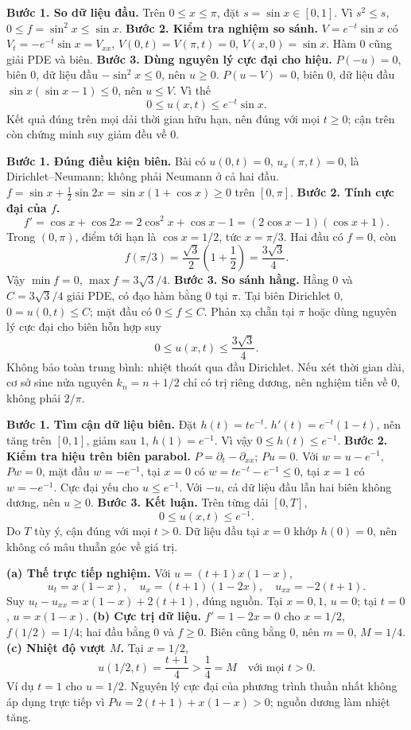 \textbf{Bước 1. So dữ liệu đầu.} Trên $0\le x\le\pi$, đặt $s=\sin x\in[0,1]$. Vì $s^2\le s$, $0\le f=\sin^2x\le\sin x$.
\textbf{Bước 2. Kiểm tra nghiệm so sánh.} $V=e^{-t}\sin x$ có $V_t=-e^{-t}\sin x=V_{xx}$, $V(0,t)=V(\pi,t)=0$, $V(x,0)=\sin x$. Hàm $0$ cũng giải PDE và biên.
\textbf{Bước 3. Dùng nguyên lý cực đại cho hiệu.} $P(-u)=0$, biên $0$, dữ liệu đầu $-\sin^2x\le0$, nên $u\ge0$. $P(u-V)=0$, biên $0$, dữ liệu đầu $\sin x(\sin x-1)\le0$, nên $u\le V$. Vì thế
\[0\le u(x,t)\le e^{-t}\sin x.\]
Kết quả đúng trên mọi dải thời gian hữu hạn, nên đúng với mọi $t\ge0$; cận trên còn chứng minh suy giảm đều về $0$.

\textbf{Bước 1. Đúng điều kiện biên.} Bài có $u(0,t)=0$, $u_x(\pi,t)=0$, là Dirichlet–Neumann; không phải Neumann ở cả hai đầu. $f=\sin x+\frac12\sin2x=\sin x(1+\cos x)\ge0$ trên $[0,\pi]$.
\textbf{Bước 2. Tính cực đại của $f$.}
\[f'=\cos x+\cos2x=2\cos^2x+\cos x-1
=(2\cos x-1)(\cos x+1).\]
Trong $(0,\pi)$, điểm tới hạn là $\cos x=1/2$, tức $x=\pi/3$. Hai đầu có $f=0$, còn
\[f(\pi/3)=\frac{\sqrt3}2\left(1+\frac12\right)=\frac{3\sqrt3}4.\]
Vậy $\min f=0$, $\max f=3\sqrt3/4$.
\textbf{Bước 3. So sánh hằng.} Hằng $0$ và $C=3\sqrt3/4$ giải PDE, có đạo hàm bằng $0$ tại $\pi$. Tại biên Dirichlet $0$, $0=u(0,t)\le C$; mặt đầu có $0\le f\le C$. Phản xạ chẵn tại $\pi$ hoặc dùng nguyên lý cực đại cho biên hỗn hợp suy
\[0\le u(x,t)\le\frac{3\sqrt3}4.\]
Không bảo toàn trung bình: nhiệt thoát qua đầu Dirichlet. Nếu xét thời gian dài, cơ sở sine nửa nguyên $k_n=n+1/2$ chỉ có trị riêng dương, nên nghiệm tiến về $0$, không phải $2/\pi$.

\textbf{Bước 1. Tìm cận dữ liệu biên.} Đặt $h(t)=te^{-t}$. $h'(t)=e^{-t}(1-t)$, nên tăng trên $[0,1]$, giảm sau $1$, $h(1)=e^{-1}$. Vì vậy $0\le h(t)\le e^{-1}$.
\textbf{Bước 2. Kiểm tra hiệu trên biên parabol.} $P=\partial_t-\partial_{xx}$; $Pu=0$. Với $w=u-e^{-1}$, $Pw=0$, mặt đầu $w=-e^{-1}$, tại $x=0$ có $w=te^{-t}-e^{-1}\le0$, tại $x=1$ có $w=-e^{-1}$. Cực đại yếu cho $u\le e^{-1}$. Với $-u$, cả dữ liệu đầu lẫn hai biên không dương, nên $u\ge0$.
\textbf{Bước 3. Kết luận.} Trên từng dải $[0,T]$,
\[0\le u(x,t)\le e^{-1}.\]
Do $T$ tùy ý, cận đúng với mọi $t>0$. Dữ liệu đầu tại $x=0$ khớp $h(0)=0$, nên không có mâu thuẫn góc về giá trị.

\textbf{(a) Thế trực tiếp nghiệm.} Với $u=(t+1)x(1-x)$,
\[u_t=x(1-x),\quad u_x=(t+1)(1-2x),\quad u_{xx}=-2(t+1).\]
Suy $u_t-u_{xx}=x(1-x)+2(t+1)$, đúng nguồn. Tại $x=0,1$, $u=0$; tại $t=0$, $u=x(1-x)$.
\textbf{(b) Cực trị dữ liệu.} $f'=1-2x=0$ cho $x=1/2$, $f(1/2)=1/4$; hai đầu bằng $0$ và $f\ge0$. Biên cũng bằng $0$, nên $m=0$, $M=1/4$.
\textbf{(c) Nhiệt độ vượt $M$.} Tại $x=1/2$,
\[u(1/2,t)=\frac{t+1}4>\frac14=M\quad\text{với mọi }t>0.\]
Ví dụ $t=1$ cho $u=1/2$. Nguyên lý cực đại của phương trình thuần nhất không áp dụng trực tiếp vì $Pu=2(t+1)+x(1-x)>0$; nguồn dương làm nhiệt tăng.
